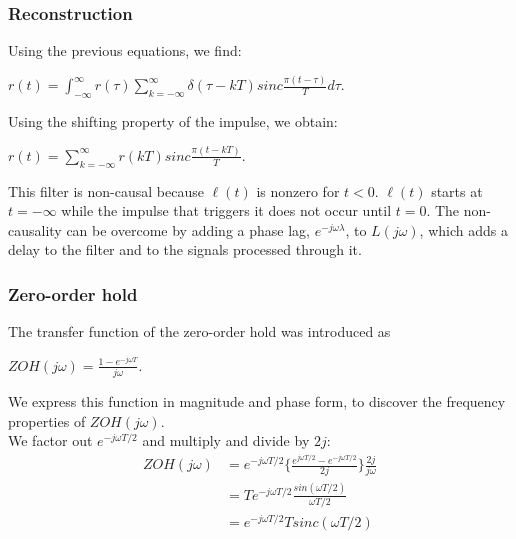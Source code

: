 \begin{frame}
	\frametitle{Reconstruction}
	\begin{block}{}
	Using the previous equations, we find:\\
	\begin{center}
	$r(t)=\int_{-\infty}^{\infty} r(\tau)\sum_{k=-\infty}^{\infty} \delta(\tau-kT)sinc\frac{\pi(t-\tau)}{T}d\tau.$
	\end{center}
	Using the shifting property of the impulse, we obtain:
	\begin{center}
	${r(t)=\sum_{k=-\infty}^{\infty} r(kT)sinc\frac{\pi(t-kT)}{T}}$.
	\end{center}
	\end{block}
	\begin{alertblock}{}
	This filter is non-causal because $\ell(t)$ is nonzero for $t < 0$. $\ell(t)$ starts at $t=-\infty$ while the impulse that triggers it does not occur until $t=0$. The non-causality can be overcome by adding a phase lag, $e^{-j\omega \lambda}$, to $L(j\omega)$, which adds a delay to the filter and to the signals processed through it.
	\end{alertblock}
\end{frame}

\begin{frame}
	\frametitle{Zero-order hold}
	The transfer function of the zero-order hold was introduced as\\
	\vspace{-1ex}
	\begin{center}
		$ZOH(j\omega)=\frac{1-e^{-j\omega T}}{j\omega}$.\\
	\end{center}
	\vspace{-1ex}
	We express this function in magnitude and phase form, to discover the frequency properties of $ZOH(j\omega)$.\\
	\medskip
	We factor out $e^{-j\omega T/2}$ and multiply and divide by $2j$:\\
	\vspace{-4ex}
	\begin{equation}
	\begin{split}
		ZOH(j\omega) &= e^{-j\omega T/2}\Big\{\frac{e^{j\omega T/2}-e^{-j\omega T/2}}{2j}\Big\} \frac{2j}{j\omega}\\
		& = Te^{-j\omega T/2} \frac{sin(\omega T/2)}{\omega T/2}\\
		& = e^{-j\omega T/2} T sinc(\omega T/2)
	\end{split} \nonumber
	\end{equation}
	\vspace{-1ex}
\end{frame}

